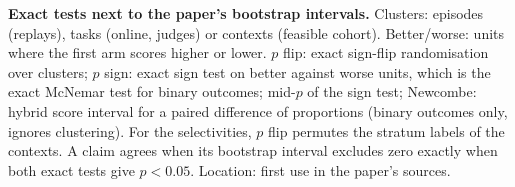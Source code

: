 \begin{table}[h]
\centering\scriptsize
\resizebox{\linewidth}{!}{}
\caption{\textbf{Exact tests next to the paper's bootstrap intervals.} Clusters: episodes (replays), tasks (online, judges) or contexts (feasible cohort). Better/worse: units where the first arm scores higher or lower. $p$ flip: exact sign-flip randomisation over clusters; $p$ sign: exact sign test on better against worse units, which is the exact McNemar test for binary outcomes; mid-$p$ of the sign test; Newcombe: hybrid score interval for a paired difference of proportions (binary outcomes only, ignores clustering). For the selectivities, $p$ flip permutes the stratum labels of the contexts. A claim agrees when its bootstrap interval excludes zero exactly when both exact tests give $p<0.05$. Location: first use in the paper's sources.}
\label{tab:exact}
\end{table}
